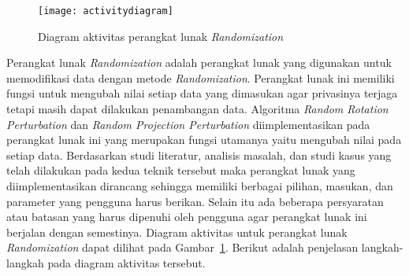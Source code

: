 \begin{figure}
    \centering
    \texttt{[image: activitydiagram]}
    \caption{Diagram aktivitas perangkat lunak \textit{Randomization}}
    \label{fig:activitydiagram}
\end{figure}

Perangkat lunak \textit{Randomization} adalah perangkat lunak yang digunakan untuk memodifikasi data dengan metode \textit{Randomization}. Perangkat lunak ini memiliki fungsi untuk mengubah nilai setiap data yang dimasukan agar privasinya terjaga tetapi masih dapat dilakukan penambangan data. Algoritma \textit{Random Rotation Perturbation} dan \textit{Random Projection Perturbation} diimplementasikan pada perangkat lunak ini yang merupakan fungsi utamanya yaitu mengubah nilai pada setiap data. Berdasarkan studi literatur, analisis masalah, dan studi kasus yang telah dilakukan pada kedua teknik tersebut maka perangkat lunak yang diimplementasikan dirancang sehingga memiliki berbagai pilihan, masukan, dan parameter yang pengguna harus berikan. Selain itu ada beberapa persyaratan atau batasan yang harus dipenuhi oleh pengguna agar perangkat lunak ini berjalan dengan semestinya. Diagram aktivitas untuk perangkat lunak \textit{Randomization} dapat dilihat pada Gambar~\ref{fig:activitydiagram}. Berikut adalah penjelasan langkah-langkah pada diagram aktivitas tersebut.
